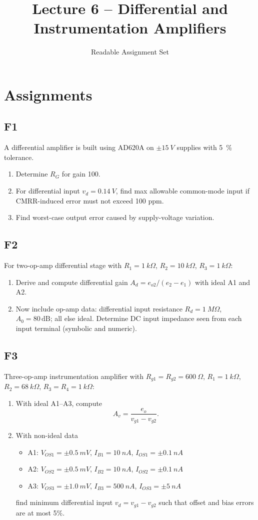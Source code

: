 \documentclass[12pt,a4paper]{article}
\title{Lecture 6 -- Differential and Instrumentation Amplifiers}
\author{Readable Assignment Set}
\date{}
\begin{document}
\maketitle
\tableofcontents

\section{Assignments}
\subsection{F1}
A differential amplifier is built using AD620A on \(\pm\SI{15}{V}\) supplies with \SI{5}{\percent} tolerance.
\begin{enumerate}
\item Determine $R_G$ for gain 100.
\item For differential input $v_d=\SI{0.14}{V}$, find max allowable common-mode input if CMRR-induced error must not exceed 100 ppm.
\item Find worst-case output error caused by supply-voltage variation.
\end{enumerate}

\subsection{F2}
For two-op-amp differential stage with $R_1=\SI{1}{k\Omega}$, $R_2=\SI{10}{k\Omega}$, $R_3=\SI{1}{k\Omega}$:
\begin{enumerate}
\item Derive and compute differential gain $A_d=e_{o2}/(e_2-e_1)$ with ideal A1 and A2.
\item Now include op-amp data: differential input resistance $R_d=\SI{1}{M\Omega}$, $A_0=80\,\text{dB}$; all else ideal. Determine DC input impedance seen from each input terminal (symbolic and numeric).
\end{enumerate}

\subsection{F3}
Three-op-amp instrumentation amplifier with $R_{g1}=R_{g2}=\SI{600}{\Omega}$, $R_1=\SI{1}{k\Omega}$, $R_2=\SI{68}{k\Omega}$, $R_3=R_4=\SI{1}{k\Omega}$:
\begin{enumerate}
\item With ideal A1--A3, compute 
\[
A_v=\frac{e_o}{v_{g1}-v_{g2}}.
\]
\item With non-ideal data
\begin{itemize}
\item A1: $V_{OS1}=\pm\SI{0.5}{mV}$, $I_{B1}=\SI{10}{nA}$, $I_{OS1}=\pm\SI{0.1}{nA}$
\item A2: $V_{OS2}=\pm\SI{0.5}{mV}$, $I_{B2}=\SI{10}{nA}$, $I_{OS2}=\pm\SI{0.1}{nA}$
\item A3: $V_{OS3}=\pm\SI{1.0}{mV}$, $I_{B3}=\SI{500}{nA}$, $I_{OS3}=\pm\SI{5}{nA}$
\end{itemize}
find minimum differential input $v_d=v_{g1}-v_{g2}$ such that offset and bias errors are at most 5\%.
\end{enumerate}
\end{document}
